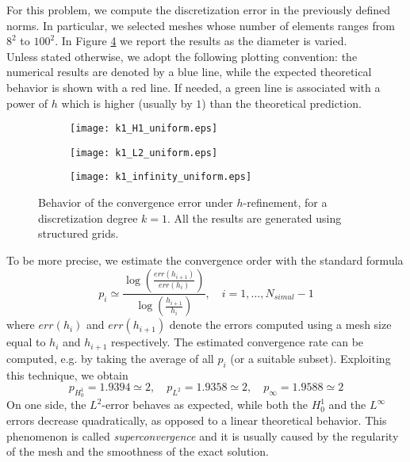 \documentclass[10pt]{article}
\begin{document}
For this problem, we compute the discretization error in the previously defined norms. In particular, we selected meshes whose number of elements ranges from $8^2$ to $100^2$. In Figure \ref{fig:k1_uniform} we report the results as the diameter is varied. \\
Unless stated otherwise, we adopt the following plotting convention: the numerical results are denoted by a blue line, while the expected theoretical behavior is shown with a red line. If needed, a green line is associated with a power of $h$ which is higher (usually by $1$) than the theoretical prediction.
\begin{figure}[H]
	\centering
	\begin{subfigure}{0.32\textwidth}
		\centering
		\texttt{[image: k1\_H1\_uniform.eps]}
		\label{fig:k1_H1_uniform}
	\end{subfigure}
	\begin{subfigure}{0.32\textwidth}
		\centering
		\texttt{[image: k1\_L2\_uniform.eps]}
		\label{fig:k1_L2_uniform}
	\end{subfigure}
	\begin{subfigure}{0.32\textwidth}
		\centering
		\texttt{[image: k1\_infinity\_uniform.eps]}
		\label{fig:k1_infinity_uniform}
	\end{subfigure}
	\caption{Behavior of the convergence error under $h$-refinement, for a discretization degree $k=1$. All the results are generated using structured grids.}
	\label{fig:k1_uniform}
\end{figure}
To be more precise, we estimate the convergence order with the standard formula
$$p_i\simeq \frac{\log \left( \frac{err(h_{i+1})}{err(h_{i})}  \right)}{\log \left( \frac{h_{i+1}}{h_{i}}  \right)}, \quad i=1,\dots,N_{simul}-1$$
where $err(h_{i})$ and $err(h_{i+1})$ denote the errors computed using a mesh size equal to $h_{i}$ and $h_{i+1}$ respectively. The estimated convergence rate can be computed, e.g. by taking the average of all $p_i$ (or a suitable subset). Exploiting this technique, we obtain
$$p_{H^1_0}=1.9394\simeq2, \quad p_{L^2}=1.9358\simeq2, \quad p_\infty=1.9588\simeq2$$
On one side, the $L^2$-error behaves as expected, while both the $H^1_0$ and the $L^\infty$ errors decrease quadratically, as opposed to a linear theoretical behavior. This phenomenon is called \textit{superconvergence} and it is usually caused by the regularity of the mesh and the smoothness of the exact solution. \\
\end{document}
